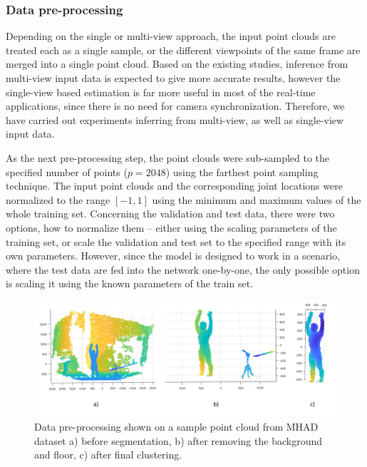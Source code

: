 \subsubsection{Data pre-processing}
Depending on the single or multi-view approach, the input point clouds are treated each as a single sample, or the different viewpoints of the same frame are merged into a single point cloud. Based on the existing studies, inference from multi-view input data is expected to give more accurate results, however the single-view based estimation is far more useful in most of the real-time applications, since there is no need for camera synchronization. Therefore, we have carried out experiments inferring from multi-view, as well as single-view input data.\par
\par
\vspace{5mm}
\noindent
As the next pre-processing step, the point clouds were sub-sampled to the specified number of points ($p = 2048$) using the farthest point sampling technique. The input point clouds and the corresponding joint locations were normalized to the range $ [-1, 1]$ using the minimum and maximum values of the whole training set. Concerning the validation and test data, there were two options, how to normalize them – either using the scaling parameters of the training set, or scale the validation and test set to the specified range with its own parameters. However, since the model is designed to work in a scenario, where the test data are fed into the network one-by-one, the only possible option is scaling it using the known parameters of the train set.\par

\vspace{5mm}

\begin{figure}[H]
\begin{center}
  \includegraphics[width=\textwidth]{images/implementation/mhad.png}
  \caption[Data pre-processing shown on a point cloud from MHAD dataset.]{ Data pre-processing shown on a sample point cloud from MHAD dataset a) before segmentation, b) after removing the background and floor, c) after final clustering.}
  \label{fig:mhad}
\end{center}
\end{figure}

